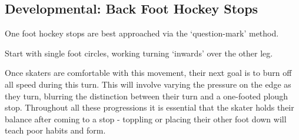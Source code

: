\subsection{Developmental: Back Foot Hockey Stops}

One foot hockey stops are best approached via the `question-mark' method.

Start with single foot circles, working turning `inwards' over the other leg.

Once skaters are comfortable with this movement, their next goal is to burn off all speed during this turn.
This will involve varying the pressure on the edge as they turn, blurring the distinction between their turn and a one-footed plough stop.
Throughout all these progressions it is essential that the skater holds their balance after coming to a stop - toppling or placing their other foot down will teach poor habits and form.  


